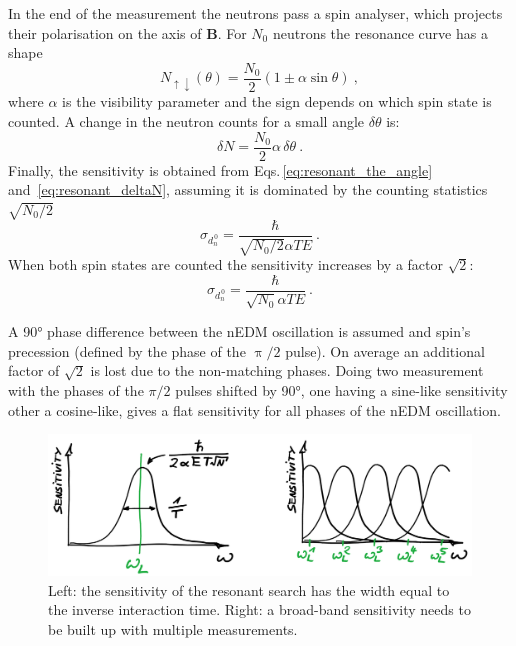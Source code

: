 In the end of the measurement the neutrons pass a spin analyser, which projects their polarisation on the axis of $\mathbf{B}$. For $N_0$ neutrons the resonance curve has a shape
\begin{equation}
  N_{\uparrow \downarrow}(\theta) = \frac{N_0}{2} \left( 1 \pm \alpha \sin \theta  \right)  \ ,
\end{equation}
where $\alpha$ is the visibility parameter and the sign depends on which spin state is counted. A change in the neutron counts for a small angle $\delta \theta$ is:
\begin{equation}
  \delta N = \frac{N_0}{2} \alpha \, \delta \theta \ .
  \label{eq:resonant_deltaN}
\end{equation}
Finally, the sensitivity is obtained from Eqs.\,\ref{eq:resonant_the_angle} and~\ref{eq:resonant_deltaN}, assuming it is dominated by the counting statistics $\sqrt{N_0/2}$
\begin{equation}
  \sigma_{d_n^{\,0}} = \frac{\hbar}{\sqrt{N_0/2} \alpha T E} \ .
\end{equation}
When both spin states are counted the sensitivity increases by a factor $\sqrt{2}$:
\begin{equation}
  \sigma_{d_n^{\,0}} = \frac{\hbar}{\sqrt{N_0} \alpha T E} \ .
\end{equation}

A \ang{90} phase difference between the nEDM oscillation is assumed and spin's precession (defined by the phase of the $\uppi/2$ pulse). On average an additional factor of $\sqrt{2}$ is lost due to the non-matching phases.
Doing two measurement with the phases of the $\pi/2$ pulses shifted by \ang{90}, one having a sine-like sensitivity other a cosine-like, gives a flat sensitivity for all phases of the nEDM oscillation.

\begin{figure}
  \centering
  \includegraphics[width=\linewidth]{gfx/axions/resonant_sensitivity.png}
  \caption{Left: the sensitivity of the resonant search has the width equal to the inverse interaction time. Right: a broad-band sensitivity needs to be built up with multiple measurements.}\label{fig:axions_resonant_sensitivity}
\end{figure}

